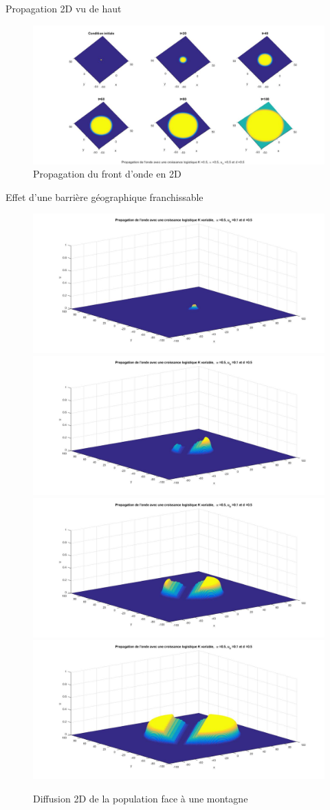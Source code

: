 \documentclass[10pt]{beamer}
\begin{document}
\begin{frame}{Propagation 2D vu de haut}{}
\begin{figure}[H]
	\centering
    \includegraphics[width=1\linewidth]{SimulationKPP/KPP15}
    \caption{Propagation du front d'onde en 2D}
\end{figure}
\end{frame}

\begin{frame}{Effet d'une barrière géographique franchissable}{}
\begin{figure}[H]
	\centering
	\includegraphics[width=0.5\linewidth]{SimulationKPP/Enviro/montagne1}\hfill
	\includegraphics[width=0.5\linewidth]{SimulationKPP/Enviro/montagne3}\hfill
	\includegraphics[width=0.5\linewidth]{SimulationKPP/Enviro/montagne5}\hfill
	\includegraphics[width=0.5\linewidth]{SimulationKPP/Enviro/montagne8}
	\caption{Diffusion 2D de la population face à une montagne}
\end{figure}
\end{frame}
\end{document}
